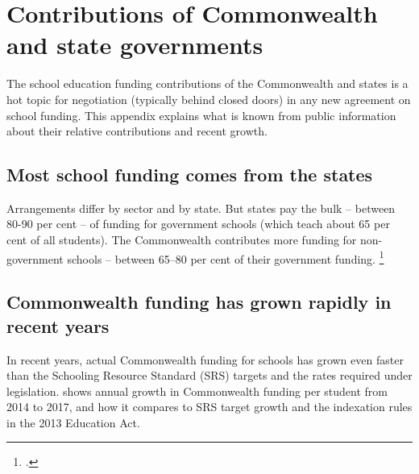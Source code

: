 \documentclass{grattan}
\begin{document}
\chapter{Contributions of Commonwealth and state governments}\label{chap:appendix-3-contributions-of-commonwealth-and-state-governments}

The school education funding contributions of the Commonwealth and states is a hot topic for negotiation (typically behind closed doors) in any new agreement on school funding. This appendix explains what is known from public information about their relative contributions and recent growth.

\section{Most school funding comes from the states}\label{sec:most-school-funding-comes-from-the-states}

Arrangements differ by sector and by state. But states pay the bulk -- between 80-90 per cent -- of funding for government schools (which teach about 65 per cent of all students). The Commonwealth contributes more funding for non-government schools -- between 65--80 per cent of their government funding.%
\footcite{Commission2016ReportGovernmentServices}

\section{Commonwealth funding has grown rapidly in recent years}\label{sec:commonwealth-funding-has-been-growing-rapidly-in-recent-years}

In recent years, actual Commonwealth funding for schools has grown even faster than the Schooling Resource Standard (SRS) targets and the rates required under legislation.  shows annual growth in Commonwealth funding per student from 2014 to 2017, and how it compares to SRS target growth and the indexation rules in the 2013 Education Act.
\end{document}
